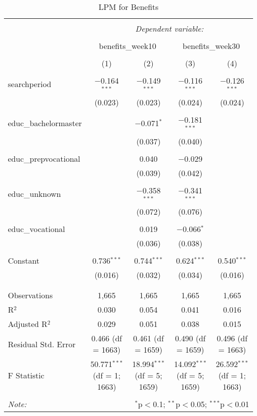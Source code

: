\documentclass[
]{article}
\begin{document}
\begin{table}[!htbp] \centering 
  \caption{LPM for Benefits} 
  \label{} 
\begin{tabular}{@{\extracolsep{5pt}}lcccc} 
\\[-1.8ex]\hline 
\hline \\[-1.8ex] 
 & \multicolumn{4}{c}{\textit{Dependent variable:}} \\ 
\cline{2-5} 
\\[-1.8ex] & \multicolumn{2}{c}{benefits\_week10} & \multicolumn{2}{c}{benefits\_week30} \\ 
\\[-1.8ex] & (1) & (2) & (3) & (4)\\ 
\hline \\[-1.8ex] 
 searchperiod & $-$0.164$^{***}$ & $-$0.149$^{***}$ & $-$0.116$^{***}$ & $-$0.126$^{***}$ \\ 
  & (0.023) & (0.023) & (0.024) & (0.024) \\ 
  & & & & \\ 
 educ\_bachelormaster &  & $-$0.071$^{*}$ & $-$0.181$^{***}$ &  \\ 
  &  & (0.037) & (0.040) &  \\ 
  & & & & \\ 
 educ\_prepvocational &  & 0.040 & $-$0.029 &  \\ 
  &  & (0.039) & (0.042) &  \\ 
  & & & & \\ 
 educ\_unknown &  & $-$0.358$^{***}$ & $-$0.341$^{***}$ &  \\ 
  &  & (0.072) & (0.076) &  \\ 
  & & & & \\ 
 educ\_vocational &  & 0.019 & $-$0.066$^{*}$ &  \\ 
  &  & (0.036) & (0.038) &  \\ 
  & & & & \\ 
 Constant & 0.736$^{***}$ & 0.744$^{***}$ & 0.624$^{***}$ & 0.540$^{***}$ \\ 
  & (0.016) & (0.032) & (0.034) & (0.016) \\ 
  & & & & \\ 
\hline \\[-1.8ex] 
Observations & 1,665 & 1,665 & 1,665 & 1,665 \\ 
R$^{2}$ & 0.030 & 0.054 & 0.041 & 0.016 \\ 
Adjusted R$^{2}$ & 0.029 & 0.051 & 0.038 & 0.015 \\ 
Residual Std. Error & 0.466 (df = 1663) & 0.461 (df = 1659) & 0.490 (df = 1659) & 0.496 (df = 1663) \\ 
F Statistic & 50.771$^{***}$ (df = 1; 1663) & 18.994$^{***}$ (df = 5; 1659) & 14.092$^{***}$ (df = 5; 1659) & 26.592$^{***}$ (df = 1; 1663) \\ 
\hline 
\hline \\[-1.8ex] 
\textit{Note:}  & \multicolumn{4}{r}{$^{*}$p$<$0.1; $^{**}$p$<$0.05; $^{***}$p$<$0.01} \\ 
\end{tabular} 
\end{table}
\end{document}
